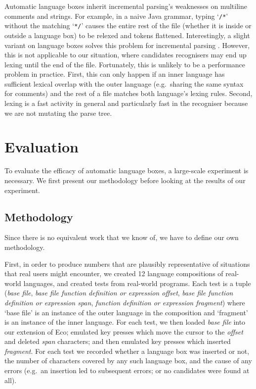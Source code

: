 \documentclass[sigplan,screen]{acmart}
\begin{document}
Automatic language boxes inherit incremental parsing's weaknesses on multiline
comments and strings. For example, in a naive Java grammar, typing
`\texttt{/*}' without the matching `\texttt{*/}' causes the entire rest of the
file (whether it is inside or outside a language box) to be relexed and tokens
flattened. Interestingly, a slight variant on language boxes solves this problem
for incremental parsing \cite[p.~108--122]{diekmann18editing}.
However, this is not applicable to our situation, where candidates
recognisers may end up lexing until the end of the file. Fortunately, this is
unlikely to be a performance problem in practice. First, this can only happen
if an inner language has sufficient lexical overlap with the outer language
(e.g.~sharing the same syntax for comments) and the rest of a file matches both
language's lexing rules.  Second, lexing is a fast activity in general and
particularly fast in the recogniser because we are not mutating the parse tree.


\section{Evaluation}
\label{sec:evaluation}

To evaluate the efficacy of automatic language boxes, a large-scale experiment
is necessary. We first present our methodology before looking at the results of
our experiment.


\subsection{Methodology}

Since there is no equivalent work that we know of, we have to
define our own methodology.

First, in order to produce numbers that are plausibly representative of situations
that real users might encounter, we created 12 language compositions of
real-world languages, and created \totalinsertions tests from real-world
programs. Each test is a tuple (\emph{base file}, \emph{base file function
definition or expression offset}, \emph{base file function definition or
expression span}, \emph{function definition or expression fragment}) where
`base file' is an instance of the outer language in the composition and
`fragment' is an instance of the inner language. For each test, we then loaded
\emph{base file} into our extension of Eco; emulated key presses which move the
cursor to the \emph{offset} and deleted \emph{span} characters; and then
emulated key presses which inserted \emph{fragment}. For each test we recorded
whether a language box was inserted or not, the number of characters covered
by any such language box, and the cause of any errors (e.g.~an insertion
led to subsequent errors; or no candidates were found at all).
\end{document}
